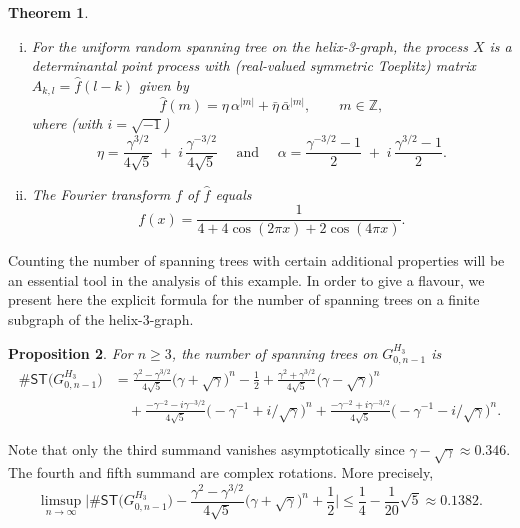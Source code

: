 \documentclass[11pt]{article}
\providecommand{\1}{\mathBB{1}}
\newcommand{\mbu}{\quad\mbox{ and }\quad}
\newcommand{\Z}{{\mathbb{Z}}}
\def\hatf{\widehat f}
\def\SPT{\mathsf{ST}}
\newtheorem{proposition}{Proposition}[section]
\newtheorem{theorem}[proposition]{Theorem}
\begin{document}
\begin{theorem}
\label{T3}
\begin{enumerate}[(i)]
\item
For the uniform random spanning tree on the helix-3-graph, the process $X$ is a determinantal point process with (real-valued symmetric Toeplitz) matrix $A_{k,l}=\hatf(l-k)$ given by
\begin{equation}
\label{E1.20}
\hatf(m)=\eta\, \alpha^{|m|}+\bar\eta\,\bar\alpha^{|m|},\qquad m\in\Z,
\end{equation}
where (with $i=\sqrt{-1}$)
\begin{equation}
\label{E1.21}
\eta=\frac{\gamma^{3/2}}{4\sqrt{5}}\;+\;i\,\frac{\gamma^{-3/2}}{4\sqrt{5}}\mbu
\alpha=\frac{\gamma^{-3/2}-1}{2}\;+\;i\,\frac{\gamma^{3/2}-1}{2}.
\end{equation}
\item
The Fourier transform $f$ of $\hatf$ equals
\begin{equation}
\label{E1.22}
f(x)=\frac{1}{4+4\cos(2\pi x)+2\cos(4\pi x)}.
\end{equation}
\end{enumerate}
\end{theorem}
Counting the number of spanning trees with certain additional properties will be an essential tool in the analysis of this example. In order to give a flavour, we present here the explicit formula for the number of spanning trees on a finite subgraph of the helix-3-graph.
\begin{proposition}
\label{P1.5}
For $n\geq3$, the number of spanning trees on $G^{H_3}_{0,n-1}$ is
$$\begin{aligned}
\#\SPT\big(G^{H_3}_{0,n-1}\big)&=\frac{\gamma^2-\gamma^{3/2}}{4\sqrt{5}}\big(\gamma+\sqrt{\gamma}\big)^n
-\frac12
+\frac{\gamma^2+\gamma^{3/2}}{4\sqrt{5}}\big(\gamma-\sqrt{\gamma}\big)^n\\
&\quad
+\frac{-\gamma^{-2}-i\gamma^{-3/2}}{4\sqrt{5}}\big(-\gamma^{-1}+i/\sqrt{\gamma}\big)^n
+\frac{-\gamma^{-2}+i\gamma^{-3/2}}{4\sqrt{5}}\big(-\gamma^{-1}-i/\sqrt{\gamma}\big)^n.
\end{aligned}
$$
\end{proposition}
Note that only the third summand vanishes asymptotically since $\gamma-\sqrt\gamma\approx0.346$. The fourth and fifth summand are complex rotations. More precisely,
$$\limsup_{n\to\infty}\Big|\#\SPT\big(G^{H_3}_{0,n-1}\big)-\frac{\gamma^2-\gamma^{3/2}}{4\sqrt{5}}\big(\gamma+\sqrt{\gamma}\big)^n+\frac12\Big|
\leq\frac14-\frac{1}{20}\sqrt{5}\approx 0.1382.$$
\end{document}
